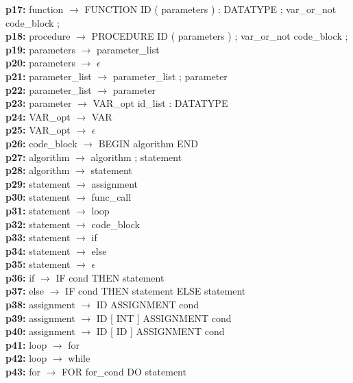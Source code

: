 \documentclass[12pt,a4paper]{report}
\begin{document}
\begin{tabbing}
\textbf{p17:} \> function \(\to\) FUNCTION ID ( parameters ) : DATATYPE ; var\_or\_not code\_block ; \\
\textbf{p18:} \> procedure \(\to\) PROCEDURE ID ( parameters ) ; var\_or\_not code\_block ; \\
\textbf{p19:} \> parameters \(\to\) parameter\_list \\
\textbf{p20:} \> parameters \(\to\) \(\epsilon\) \\
\textbf{p21:} \> parameter\_list \(\to\) parameter\_list ; parameter \\
\textbf{p22:} \> parameter\_list \(\to\) parameter \\
\textbf{p23:} \> parameter \(\to\) VAR\_opt id\_list : DATATYPE \\
\textbf{p24:} \> VAR\_opt \(\to\) VAR \\
\textbf{p25:} \> VAR\_opt \(\to\) \(\epsilon\) \\
\textbf{p26:} \> code\_block \(\to\) BEGIN algorithm END \\
\textbf{p27:} \> algorithm \(\to\) algorithm ; statement \\
\textbf{p28:} \> algorithm \(\to\) statement \\
\textbf{p29:} \> statement \(\to\) assignment \\
\textbf{p30:} \> statement \(\to\) func\_call \\
\textbf{p31:} \> statement \(\to\) loop \\
\textbf{p32:} \> statement \(\to\) code\_block \\
\textbf{p33:} \> statement \(\to\) if \\
\textbf{p34:} \> statement \(\to\) else \\
\textbf{p35:} \> statement \(\to\) \(\epsilon\) \\
\textbf{p36:} \> if \(\to\) IF cond THEN statement \\
\textbf{p37:} \> else \(\to\) IF cond THEN statement ELSE statement \\
\textbf{p38:} \> assignment \(\to\) ID ASSIGNMENT cond \\
\textbf{p39:} \> assignment \(\to\) ID [ INT ] ASSIGNMENT cond \\
\textbf{p40:} \> assignment \(\to\) ID [ ID ] ASSIGNMENT cond \\
\textbf{p41:} \> loop \(\to\) for \\
\textbf{p42:} \> loop \(\to\) while \\
\textbf{p43:} \> for \(\to\) FOR for\_cond DO statement \\

\end{tabbing}
\end{document}
